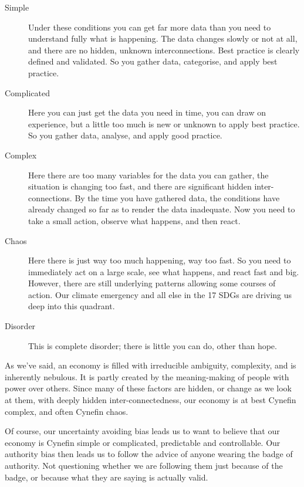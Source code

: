 \begin{description}
\item[Simple] Under these conditions you can get far more data than you need to understand fully what is happening. The data changes slowly or not at all, and there are no hidden, unknown interconnections. Best practice is clearly defined and validated. So you gather data, categorise, and apply best practice. 


\item[Complicated] Here you can just get the data you need in time, you can draw on experience, but a little too much is new or unknown to apply best practice. So you gather data, analyse, and apply good practice.


\item[Complex] Here there are too many variables for the data you can gather, the situation is changing too fast, and there are significant hidden inter-connections. By the time you have gathered data, the conditions have already changed so far as to render the data inadequate. Now you need to take a small action, observe what happens, and then react.


\item[Chaos] Here there is just way too much happening, way too fast. So you need to immediately act on a large scale, see what happens, and react fast and big. However, there are still underlying patterns allowing some courses of action. Our climate emergency and all else in the 17 SDGs are driving us deep into this quadrant.


\item[Disorder] This is complete disorder; there is little you can do, other than hope.
        \label{list:cynefin}
\end{description} 


As we’ve said, an economy is filled with irreducible ambiguity, complexity, and is inherently nebulous. It is partly created by the meaning\hyp{}making of people with power over others. Since many of these factors are hidden, or change as we look at them, with deeply hidden inter-connectedness, our economy is at best Cynefin complex, and often Cynefin chaos.


Of course, our uncertainty avoiding bias leads us to want to believe that our economy is Cynefin simple or complicated, predictable and controllable. Our authority bias then leads us to follow the advice of anyone wearing the badge of authority. Not questioning whether we are following them just because of the badge, or because what they are saying is actually valid. 


